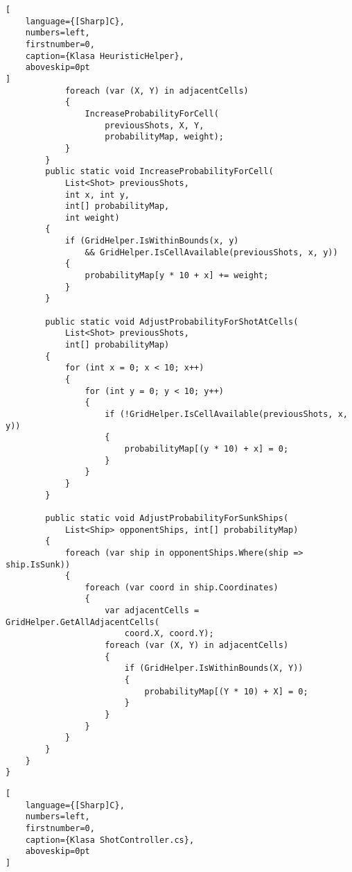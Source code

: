 \begin{addmargin}[0mm]{0mm}
\begin{lstlisting}[
    language={[Sharp]C},
    numbers=left,
    firstnumber=0,
    caption={Klasa HeuristicHelper},
    aboveskip=0pt
]
            foreach (var (X, Y) in adjacentCells)
            {
                IncreaseProbabilityForCell(
                    previousShots, X, Y,
                    probabilityMap, weight);
            }
        }
        public static void IncreaseProbabilityForCell(
            List<Shot> previousShots,
            int x, int y,
            int[] probabilityMap,
            int weight)
        {
            if (GridHelper.IsWithinBounds(x, y)
                && GridHelper.IsCellAvailable(previousShots, x, y))
            {
                probabilityMap[y * 10 + x] += weight;
            }
        }

        public static void AdjustProbabilityForShotAtCells(
            List<Shot> previousShots,
            int[] probabilityMap)
        {
            for (int x = 0; x < 10; x++)
            {
                for (int y = 0; y < 10; y++)
                {
                    if (!GridHelper.IsCellAvailable(previousShots, x, y))
                    {
                        probabilityMap[(y * 10) + x] = 0;
                    }
                }
            }
        }

        public static void AdjustProbabilityForSunkShips(
            List<Ship> opponentShips, int[] probabilityMap)
        {
            foreach (var ship in opponentShips.Where(ship => ship.IsSunk))
            {
                foreach (var coord in ship.Coordinates)
                {
                    var adjacentCells = GridHelper.GetAllAdjacentCells(
                        coord.X, coord.Y);
                    foreach (var (X, Y) in adjacentCells)
                    {
                        if (GridHelper.IsWithinBounds(X, Y))
                        {
                            probabilityMap[(Y * 10) + X] = 0;
                        }
                    }
                }
            }
        }
    }
}

\end{lstlisting}
\end{addmargin}











\begin{addmargin}[0mm]{0mm}
\begin{lstlisting}[
    language={[Sharp]C},
    numbers=left,
    firstnumber=0,
    caption={Klasa ShotController.cs},
    aboveskip=0pt
]
\end{lstlisting}
\end{addmargin}